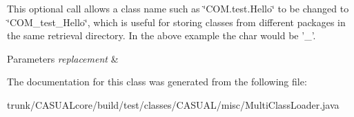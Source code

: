 This optional call allows a class name such as \char`\"{}\-C\-O\-M.\-test.\-Hello\char`\"{} to be changed to \char`\"{}\-C\-O\-M\-\_\-test\-\_\-\-Hello\char`\"{}, which is useful for storing classes from different packages in the same retrieval directory. In the above example the char would be '\-\_\-'. 
\begin{DoxyParams}{Parameters}
{\em replacement} & \\
\hline
\end{DoxyParams}


The documentation for this class was generated from the following file\-:\begin{DoxyCompactItemize}
\item 
trunk/\-C\-A\-S\-U\-A\-Lcore/build/test/classes/\-C\-A\-S\-U\-A\-L/misc/Multi\-Class\-Loader.\-java\end{DoxyCompactItemize}
